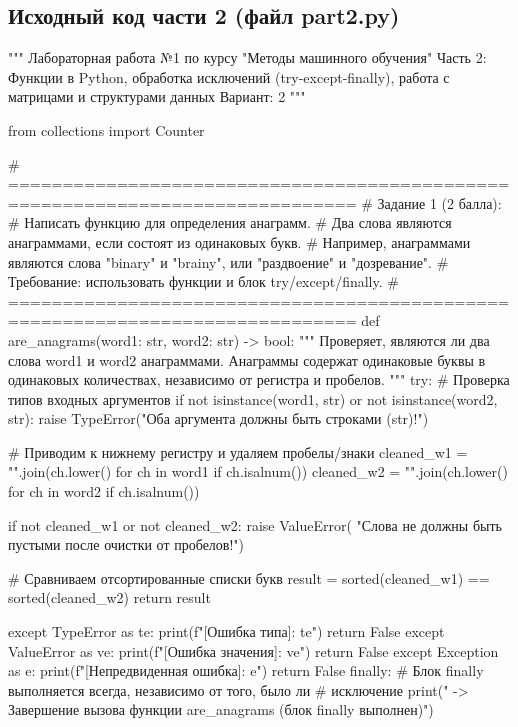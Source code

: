 \documentclass[14pt,a4paper]{extarticle}
\begin{document}
\subsection{Исходный код части 2 (файл part2.py)}
\begin{CodeListing}
"""
Лабораторная работа №1 по курсу "Методы машинного обучения"
Часть 2: Функции в Python, обработка исключений (try-except-finally), работа с матрицами и структурами данных
Вариант: 2
"""

from collections import Counter


# ==============================================================================
# Задание 1 (2 балла):
# Написать функцию для определения анаграмм.
# Два слова являются анаграммами, если состоят из одинаковых букв.
# Например, анаграммами являются слова "binary" и "brainy", или "раздвоение" и "дозревание".
# Требование: использовать функции и блок try/except/finally.
# ==============================================================================
def are_anagrams(word1: str, word2: str) -> bool:
    """
    Проверяет, являются ли два слова word1 и word2 анаграммами.
    Анаграммы содержат одинаковые буквы в одинаковых количествах,
    независимо от регистра и пробелов.
    """
    try:
        # Проверка типов входных аргументов
        if not isinstance(word1, str) or not isinstance(word2, str):
            raise TypeError("Оба аргумента должны быть строками (str)!")

        # Приводим к нижнему регистру и удаляем пробелы/знаки
        cleaned_w1 = "".join(ch.lower() for ch in word1 if ch.isalnum())
        cleaned_w2 = "".join(ch.lower() for ch in word2 if ch.isalnum())

        if not cleaned_w1 or not cleaned_w2:
            raise ValueError(
                "Слова не должны быть пустыми после очистки от пробелов!")

        # Сравниваем отсортированные списки букв
        result = sorted(cleaned_w1) == sorted(cleaned_w2)
        return result

    except TypeError as te:
        print(f"[Ошибка типа]: {te}")
        return False
    except ValueError as ve:
        print(f"[Ошибка значения]: {ve}")
        return False
    except Exception as e:
        print(f"[Непредвиденная ошибка]: {e}")
        return False
    finally:
        # Блок finally выполняется всегда, независимо от того, было ли
        # исключение
        print("  -> Завершение вызова функции are_anagrams (блок finally выполнен)")



\end{CodeListing}
\end{document}
